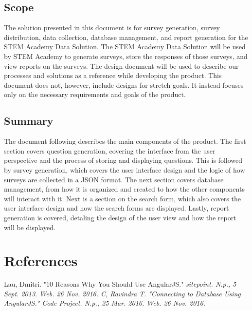 \documentclass[letterpaper,10pt,serif, draftclsnofoot,onecolumn, compsoc, titlepage]{IEEEtran}
\begin{document}
\subsection{Scope}
The solution presented in this document is for survey generation, survey distribution, data collection, database management, and report generation for the STEM Academy Data Solution.
The STEM Academy Data Solution will be used by STEM Academy to generate surveys, store the responses of those surveys, and view reports on the surveys.
The design document will be used to describe our processes and solutions as a reference while developing the product.
This document does not, however, include designs for stretch goals. 
It instead focuses only on the necessary requirements and goals of the product.
\subsection{Summary}
The document following describes the main components of the product.
The first section covers question generation, covering the interface from the user perspective and the process of storing and displaying questions.
This is followed by survey generation, which covers the user interface design and the logic of how surveys are collected in a JSON format.
The next section covers database management, from how it is organized and created to how the other components will interact with it.
Next is a section on the search form, which also covers the user interface design and how the search forms are displayed.
Lastly, report generation is covered, detaling the design of the user view and how the report will be displayed.

\section{References}

\begin{thebibliography}{2}

 Lau, Dmitri. "10 Reasons Why You Should Use AngularJS." \em{sitepoint}. N.p., 5 Sept. 2013. Web. 26 Nov. 2016.
 C, Ravindra T. "Connecting to Database Using AngularJS." \em{Code Project}. N.p., 25 Mar. 2016. Web. 26 Nov. 2016.

\end{thebibliography}
\end{document}
